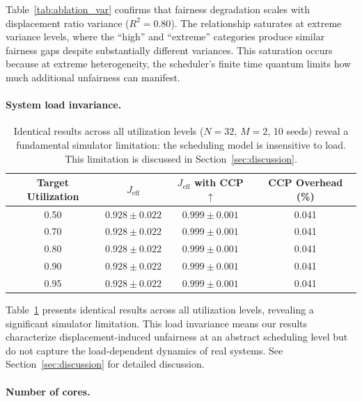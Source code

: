 \documentclass{article}
\newcommand{\jeff}{J_{\mathrm{eff}}}
\begin{document}
Table~\ref{tab:ablation_var} confirms that fairness degradation scales with displacement ratio variance ($R^2 = 0.80$). The relationship saturates at extreme variance levels, where the ``high'' and ``extreme'' categories produce similar fairness gaps despite substantially different variances. This saturation occurs because at extreme heterogeneity, the scheduler's finite time quantum limits how much additional unfairness can manifest.

\paragraph{System load invariance.}

\begin{table}[t]
\caption{Identical results across all utilization levels ($N = 32$, $M = 2$, 10 seeds) reveal a fundamental simulator limitation: the scheduling model is insensitive to load. This limitation is discussed in Section~\ref{sec:discussion}.}
\label{tab:ablation_load}
\centering
\begin{tabular}{cccc}
\toprule
Target Utilization & $\jeff$ & $\jeff$ with CCP $\uparrow$ & CCP Overhead (\%) \\
\midrule
0.50 & $0.928 \pm 0.022$ & $0.999 \pm 0.001$ & 0.041 \\
0.70 & $0.928 \pm 0.022$ & $0.999 \pm 0.001$ & 0.041 \\
0.80 & $0.928 \pm 0.022$ & $0.999 \pm 0.001$ & 0.041 \\
0.90 & $0.928 \pm 0.022$ & $0.999 \pm 0.001$ & 0.041 \\
0.95 & $0.928 \pm 0.022$ & $0.999 \pm 0.001$ & 0.041 \\
\bottomrule
\end{tabular}
\end{table}

Table~\ref{tab:ablation_load} presents identical results across all utilization levels, revealing a significant simulator limitation. This load invariance means our results characterize displacement-induced unfairness at an abstract scheduling level but do not capture the load-dependent dynamics of real systems. See Section~\ref{sec:discussion} for detailed discussion.

\paragraph{Number of cores.}
\end{document}
